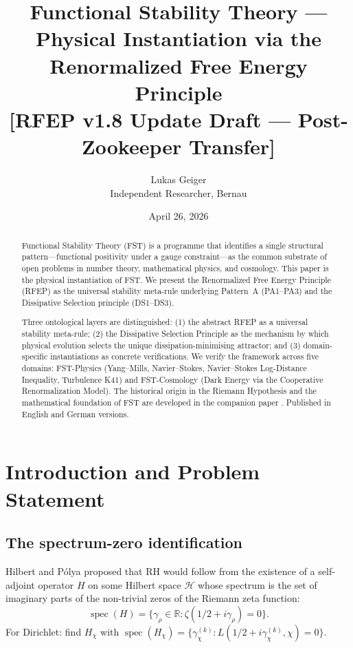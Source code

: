 \documentclass[11pt,a4paper]{article}
\title{Functional Stability Theory --- Physical Instantiation via the\\
Renormalized Free Energy Principle\\
\vspace{0.3em}
{\large [RFEP v1.8 Update Draft --- Post-Zookeeper Transfer]}}
\author{Lukas Geiger\\
\small Independent Researcher, Bernau}
\date{April 26, 2026}
\theoremstyle{plain}
\theoremstyle{definition}
\DeclareMathOperator{\spec}{spec}
\newcommand{\R}{\mathbb{R}}
\newcommand{\HH}{\mathcal{H}}
\newcommand{\chifn}{\chi}
\begin{document}
\maketitle

\begin{abstract}
Functional Stability Theory (FST) is a programme that identifies a
single structural pattern---functional positivity under a gauge
constraint---as the common substrate of open problems in number
theory, mathematical physics, and cosmology. This paper is the
physical instantiation of FST. We present the Renormalized Free
Energy Principle (RFEP) as the universal stability meta-rule
underlying Pattern~A (PA1--PA3) and the Dissipative Selection
principle (DS1--DS3).

Three ontological layers are distinguished: (1) the abstract RFEP as
a universal stability meta-rule; (2) the Dissipative Selection
Principle as the mechanism by which physical evolution selects the
unique dissipation-minimising attractor; and (3) domain-specific
instantiations as concrete verifications. We verify the framework
across five domains: FST-Physics (Yang--Mills, Navier--Stokes,
Navier--Stokes Log-Distance Inequality, Turbulence K41) and
FST-Cosmology (Dark Energy via the Cooperative Renormalization
Model). The historical origin in the Riemann Hypothesis and the
mathematical foundation of FST are developed in the companion paper
\cite{ZetaZooMaster}. Published in English and German versions.
\end{abstract}

\tableofcontents

\section{Introduction and Problem Statement}
\label{sec:intro}

\subsection{The spectrum-zero identification}

Hilbert and P\'olya proposed that RH would follow from the
existence of a self-adjoint operator $H$ on some Hilbert space
$\HH$ whose spectrum is the set of imaginary parts of the
non-trivial zeros of the Riemann zeta function:
\begin{equation}
  \spec(H) = \{\gamma_\rho \in \R : \zeta(1/2 + i\gamma_\rho) = 0\}.
\end{equation}
For Dirichlet: find $H_\chifn$ with $\spec(H_\chifn) =
\{\gamma_\chifn^{(k)} : L(1/2 + i\gamma_\chifn^{(k)}, \chifn) = 0\}$.
\end{document}
